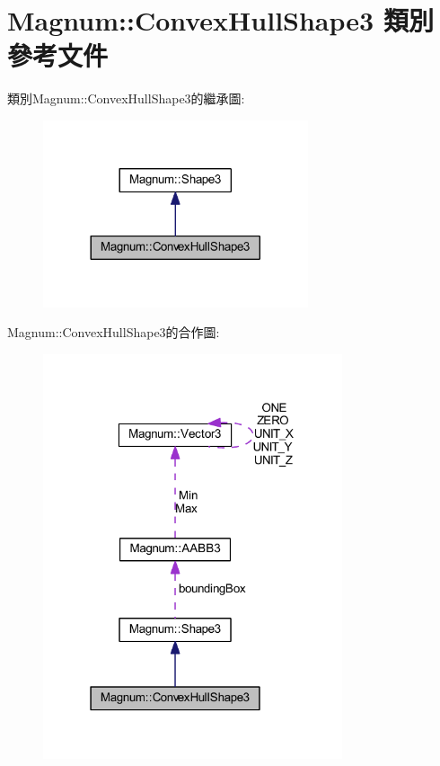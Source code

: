 \hypertarget{class_magnum_1_1_convex_hull_shape3}{}\section{Magnum\+:\+:Convex\+Hull\+Shape3 類別 參考文件}
\label{class_magnum_1_1_convex_hull_shape3}


類別\+Magnum\+:\+:Convex\+Hull\+Shape3的繼承圖\+:\nopagebreak
\begin{figure}[H]
\begin{center}
\leavevmode
\includegraphics[width=221pt]{class_magnum_1_1_convex_hull_shape3__inherit__graph}
\end{center}
\end{figure}


Magnum\+:\+:Convex\+Hull\+Shape3的合作圖\+:\nopagebreak
\begin{figure}[H]
\begin{center}
\leavevmode
\includegraphics[width=250pt]{class_magnum_1_1_convex_hull_shape3__coll__graph}
\end{center}
\end{figure}
